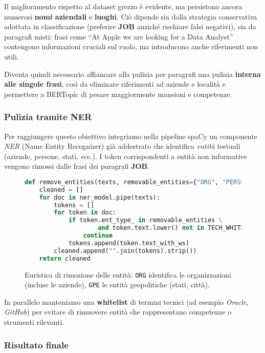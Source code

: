 \noindent Il miglioramento rispetto al dataset grezzo è evidente, ma persistono ancora numerosi \textbf{nomi aziendali} e \textbf{luoghi}. Ciò dipende sia dalla strategia conservativa adottata in classificazione (preferire \textbf{JOB} anziché rischiare falsi negativi), sia da paragrafi misti: frasi come ``At Apple we are looking for a Data Analyst'' contengono informazioni cruciali sul ruolo, ma introducono anche riferimenti non utili.

\noindent Diventa quindi necessario affiancare alla pulizia per paragrafi una pulizia \textbf{interna alle singole frasi}, così da eliminare riferimenti ad aziende e località e permettere a BERTopic di pesare maggiormente mansioni e competenze.

\subsubsection{Pulizia tramite NER}

\noindent Per raggiungere questo obiettivo integriamo nella pipeline spaCy un componente \textit{NER} (Name Entity Recognizer) già addestrato che identifica \textit{entità} testuali (aziende, persone, stati, ecc.). I token corrispondenti a entità non informative vengono rimossi dalle frasi dei paragrafi \textbf{JOB}.

\begin{figure}[H]
    \centering
    \scriptsize
\begin{lstlisting}[language=python]
def remove_entities(texts, removable_entities={"ORG", "PERSON", "GPE"}):
    cleaned = []
    for doc in ner_model.pipe(texts):
        tokens = []
        for token in doc:
            if token.ent_type_ in removable_entities \
                    and token.text.lower() not in TECH_WHITELIST:
                continue
            tokens.append(token.text_with_ws)
        cleaned.append("".join(tokens).strip())
    return cleaned
\end{lstlisting}
    \caption{Euristica di rimozione delle entità: \texttt{ORG} identifica le organizzazioni (incluse le aziende), \texttt{GPE} le entità geopolitiche (stati, città).}
    \label{fig:ner-cleaning}
\end{figure}

\noindent In parallelo manteniamo una \textbf{whitelist} di termini tecnici (ad esempio \textit{Oracle}, \textit{GitHub}) per evitare di rimuovere entità che rappresentano competenze o strumenti rilevanti.

\subsubsection{Risultato finale}

